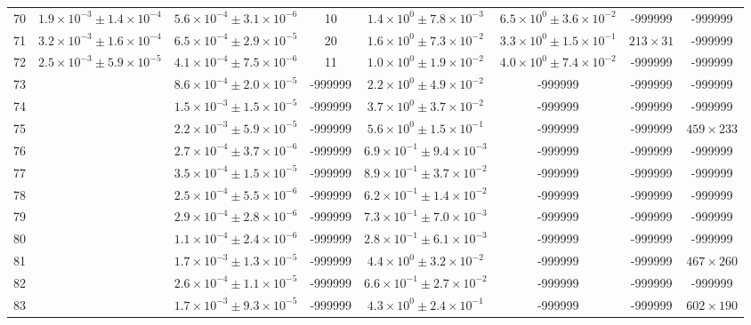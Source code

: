 \begin{table}
\begin{tabular}{cccccccc}
70 & $1.9\times10^{-3}\pm 1.4\times10^{-4}$ & $5.6\times10^{-4}\pm 3.1\times10^{-6}$ & 10 & $1.4\times10^{0}\pm 7.8\times10^{-3}$ & $6.5\times10^{0}\pm 3.6\times10^{-2}$ & -999999 & -999999 \\
71 & $3.2\times10^{-3}\pm 1.6\times10^{-4}$ & $6.5\times10^{-4}\pm 2.9\times10^{-5}$ & 20 & $1.6\times10^{0}\pm 7.3\times10^{-2}$ & $3.3\times10^{0}\pm 1.5\times10^{-1}$ & $213\times 31$ & -999999 \\
72 & $2.5\times10^{-3}\pm 5.9\times10^{-5}$ & $4.1\times10^{-4}\pm 7.5\times10^{-6}$ & 11 & $1.0\times10^{0}\pm 1.9\times10^{-2}$ & $4.0\times10^{0}\pm 7.4\times10^{-2}$ & -999999 & -999999 \\
73 &  & $8.6\times10^{-4}\pm 2.0\times10^{-5}$ & -999999 & $2.2\times10^{0}\pm 4.9\times10^{-2}$ & -999999 & -999999 & -999999 \\
74 &  & $1.5\times10^{-3}\pm 1.5\times10^{-5}$ & -999999 & $3.7\times10^{0}\pm 3.7\times10^{-2}$ & -999999 & -999999 & -999999 \\
75 &  & $2.2\times10^{-3}\pm 5.9\times10^{-5}$ & -999999 & $5.6\times10^{0}\pm 1.5\times10^{-1}$ & -999999 & -999999 & $459\times 233$ \\
76 &  & $2.7\times10^{-4}\pm 3.7\times10^{-6}$ & -999999 & $6.9\times10^{-1}\pm 9.4\times10^{-3}$ & -999999 & -999999 & -999999 \\
77 &  & $3.5\times10^{-4}\pm 1.5\times10^{-5}$ & -999999 & $8.9\times10^{-1}\pm 3.7\times10^{-2}$ & -999999 & -999999 & -999999 \\
78 &  & $2.5\times10^{-4}\pm 5.5\times10^{-6}$ & -999999 & $6.2\times10^{-1}\pm 1.4\times10^{-2}$ & -999999 & -999999 & -999999 \\
79 &  & $2.9\times10^{-4}\pm 2.8\times10^{-6}$ & -999999 & $7.3\times10^{-1}\pm 7.0\times10^{-3}$ & -999999 & -999999 & -999999 \\
80 &  & $1.1\times10^{-4}\pm 2.4\times10^{-6}$ & -999999 & $2.8\times10^{-1}\pm 6.1\times10^{-3}$ & -999999 & -999999 & -999999 \\
81 &  & $1.7\times10^{-3}\pm 1.3\times10^{-5}$ & -999999 & $4.4\times10^{0}\pm 3.2\times10^{-2}$ & -999999 & -999999 & $467\times 260$ \\
82 &  & $2.6\times10^{-4}\pm 1.1\times10^{-5}$ & -999999 & $6.6\times10^{-1}\pm 2.7\times10^{-2}$ & -999999 & -999999 & -999999 \\
83 &  & $1.7\times10^{-3}\pm 9.3\times10^{-5}$ & -999999 & $4.3\times10^{0}\pm 2.4\times10^{-1}$ & -999999 & -999999 & $602\times 190$ \\

\end{tabular}
\end{table}
